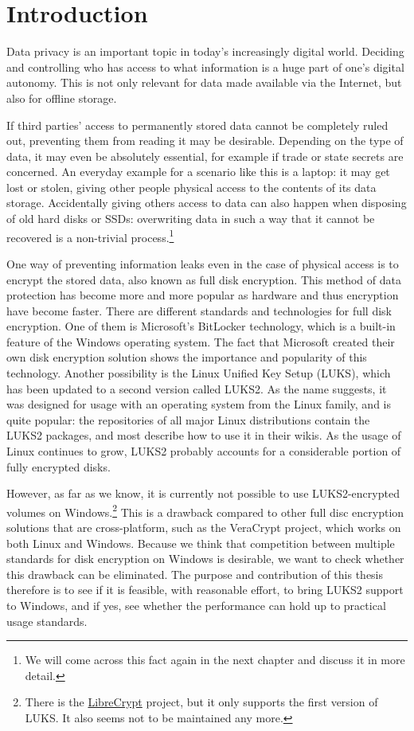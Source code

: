 \chapter{Introduction}
\label{chap:introduction}
Data privacy is an important topic in today's increasingly digital world. Deciding and controlling who has access to what information is a huge part of one's digital autonomy. This is not only relevant for data made available via the Internet, but also for offline storage.

If third parties' access to permanently stored data cannot be completely ruled out, preventing them from reading it may be desirable. Depending on the type of data, it may even be absolutely essential, for example if trade or state secrets are concerned. An everyday example for a scenario like this is a laptop: it may get lost or stolen, giving other people physical access to the contents of its data storage. Accidentally giving others access to data can also happen when disposing of old hard disks or SSDs: overwriting data in such a way that it cannot be recovered is a non-trivial process.\footnote{\label{fn:introduction.secureerasure} We will come across this fact again in the next chapter and discuss it in more detail.}

One way of preventing information leaks even in the case of physical access is to encrypt the stored data, also known as full disk encryption. This method of data protection has become more and more popular as hardware and thus encryption have become faster. There are different standards and technologies for full disk encryption. One of them is Microsoft's BitLocker technology, which is a built-in feature of the Windows operating system. The fact that Microsoft created their own disk encryption solution shows the importance and popularity of this technology. Another possibility is the Linux Unified Key Setup (LUKS), which has been updated to a second version called LUKS2. As the name suggests, it was designed for usage with an operating system from the Linux family, and is quite popular: the repositories of all major Linux distributions contain the LUKS2 packages, and most describe how to use it in their wikis. As the usage of Linux continues to grow, LUKS2 probably accounts for a considerable portion of fully encrypted disks.

However, as far as we know, it is currently not possible to use LUKS2-encrypted volumes on Windows.\footnote{\label{fn:introduction.librecrypt} There is the \href{https://t-d-k.github.io/LibreCrypt/}{LibreCrypt} project, but it only supports the first version of LUKS. It also seems not to be maintained any more.} This is a drawback compared to other full disc encryption solutions that are cross-platform, such as the VeraCrypt project, which works on both Linux and Windows. Because we think that competition between multiple standards for disk encryption on Windows is desirable, we want to check whether this drawback can be eliminated. The purpose and contribution of this thesis therefore is to see if it is feasible, with reasonable effort, to bring LUKS2 support to Windows, and if yes, see whether the performance can hold up to practical usage standards.


